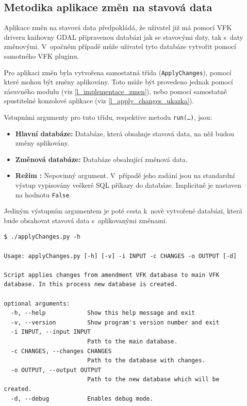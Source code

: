 \documentclass[a4paper,12pt,oneside]{book}
\begin{document}
\subsection{Metodika aplikace změn na stavová data}

Aplikace změn na stavová data předpokládá, že uživatel již má pomocí
VFK driveru knihovny GDAL připravenou databázi jak se stavovými daty,
tak s~daty změnovými. V~opačném případě může uživatel tyto databáze
vytvořit pomocí samotného VFK pluginu.

Pro aplikaci změn byla vytvořena samostatná třída
(\texttt{ApplyChanges}), pomocí které mohou být změny aplikovány. Toto
může být provedeno jednak pomocí zásuvného modulu (viz
\ref{l_implementace_zmen}), nebo pomocí samostatně spustitelné
konzolové aplikace (viz \ref{l_apply_changes_ukazka}).

Vstupními argumenty pro tuto třídu, respektive metodu
\texttt{run(\dots)}, jsou:

\begin{itemize}
 \item \textbf{Hlavní databáze:} Databáze, která obsahuje stavová data, na něž budou změny aplikovány.
 \item \textbf{Změnová databáze:} Databáze obsahující změnová data.
 \item \textbf{Režim :} Nepovinný argument. V~případě jeho
   zadání jsou na standardní výstup vypisovány veškeré SQL příkazy do
   databáze. Implicitně je nastaven na hodnotu \texttt{False}.
\end{itemize}

Jediným výstupním argumentem je poté cesta k~nově vytvořené databázi, která bude obsahovat stavová data s~aplikovanými změnami.

\begin{lstlisting}[caption={Nápověda ke konzolové aplikaci pro implementaci změn}, 
		    label=l_apply_changes_ukazka]
$ ./applyChanges.py -h

Usage: applyChanges.py [-h] [-v] -i INPUT -c CHANGES -o OUTPUT [-d]

Script applies changes from amendment VFK database to main VFK database. In this process new database is created.

optional arguments:
  -h, --help            Show this help message and exit
  -v, --version         Show program's version number and exit
  -i INPUT, --input INPUT
                        Path to the main database.
  -c CHANGES, --changes CHANGES
                        Path to the database with changes.
  -o OUTPUT, --output OUTPUT
                        Path to the new database which will be created.
  -d, --debug           Enables debug mode.

\end{lstlisting}
\end{document}
